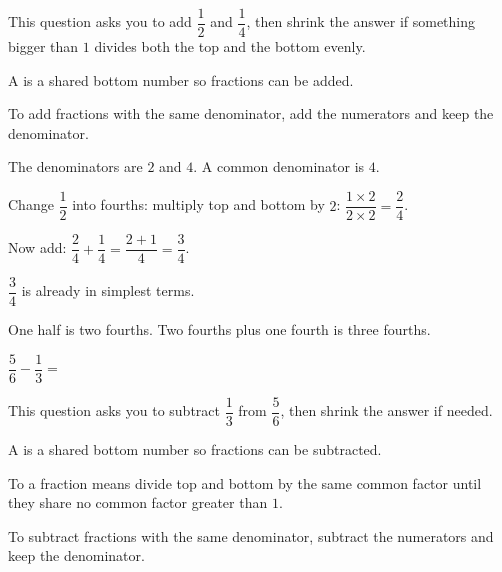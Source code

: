 
\noindent This question asks you to add $\dfrac{1}{2}$ and $\dfrac{1}{4}$, then
shrink the answer if something bigger than $1$ divides both the top and the
bottom evenly.

\begin{words}
  \item A is a shared bottom number so fractions can be
        added.
  \item To add fractions with the same denominator, add the numerators and keep
        the denominator.
\end{words}

\begin{steps}
  \item The denominators are $2$ and $4$. A common denominator is $4$.
  \item Change $\dfrac{1}{2}$ into fourths: multiply top and bottom by $2$:
        $\dfrac{1 \times 2}{2 \times 2} = \dfrac{2}{4}$.
  \item Now add: $\dfrac{2}{4} + \dfrac{1}{4} = \dfrac{2 + 1}{4} = \dfrac{3}{4}$.
  \item $\dfrac{3}{4}$ is already in simplest terms.
\end{steps}


\noindent One half is two fourths. Two fourths plus one fourth is three fourths.


\noindent $\dfrac{5}{6} - \dfrac{1}{3} = $\ansblank{}


\noindent This question asks you to subtract $\dfrac{1}{3}$ from $\dfrac{5}{6}$,
then shrink the answer if needed.

\begin{words}
  \item A is a shared bottom number so fractions can be
        subtracted.
  \item To a fraction means divide top and bottom by the same
        common factor until they share no common factor greater than $1$.
  \item To subtract fractions with the same denominator, subtract the numerators
        and keep the denominator.
\end{words}

